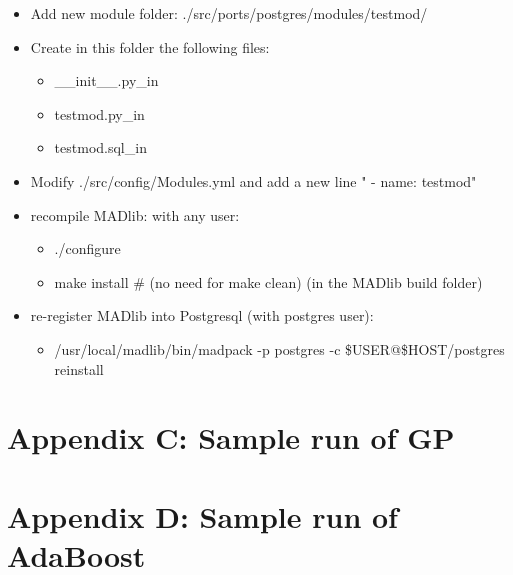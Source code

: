 \begin{itemize}
  \item Add new module folder: ./src/ports/postgres/modules/testmod/
  \item Create in this folder the following files:

\begin{itemize}
  \item \_\_init\_\_.py\_in  
  \item testmod.py\_in
  \item testmod.sql\_in
\end{itemize}

\item Modify ./src/config/Modules.yml and add a new line "	- name: testmod"
  \item recompile MADlib: with any user:

\begin{itemize}
  \item ./configure
  \item make install      \# (no need for make clean) (in the MADlib build folder)
\end{itemize}
  \item re-register MADlib into Postgresql (with postgres user):
  \begin{itemize}
  \item  /usr/local/madlib/bin/madpack -p postgres -c \$USER@\$HOST/postgres reinstall
  \end{itemize}


 \end{itemize}
 


\section*{Appendix C: Sample run of GP}


\section*{Appendix D: Sample run of AdaBoost}